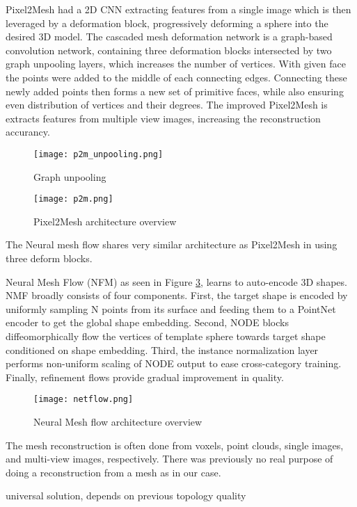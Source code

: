 Pixel2Mesh had a 2D CNN extracting features from a single image which is then leveraged by a deformation block, progressively deforming a sphere into the desired 3D model. The cascaded mesh deformation network is a graph-based convolution network, containing three deformation blocks intersected by two graph unpooling layers, which increases the number of vertices. With given face the points were added to the middle of each connecting edges. Connecting these newly added points then forms a new set of primitive faces, while also ensuring even distribution of vertices and their degrees. The improved Pixel2Mesh is extracts features from multiple view images, increasing the reconstruction accurancy. 

\begin{figure}[h]
    \centering
    \texttt{[image: p2m\_unpooling.png]}
    \caption{Graph unpooling\cite{p2m}}
    \label{fig:p2munpooling}
\end{figure}

\begin{figure}[h]
    \centering
    \texttt{[image: p2m.png]}
    \caption{Pixel2Mesh architecture overview \cite{p2m}}
    \label{fig:p2m}
\end{figure}

The Neural mesh flow shares very similar architecture as Pixel2Mesh in using three deform blocks.

Neural Mesh Flow (NFM) as seen in Figure \ref{fig:netflow}, learns to auto-encode 3D shapes. NMF broadly consists of four components. First, the target shape is encoded by uniformly sampling N points from its surface and feeding them to a PointNet \cite{pointnet} encoder to get the global shape embedding. Second, NODE blocks diffeomorphically flow the vertices of template sphere towards target shape conditioned on shape embedding. Third, the instance normalization layer performs non-uniform scaling of NODE output to ease cross-category training. Finally, refinement flows provide gradual improvement in quality.

\begin{figure}[h]
    \centering
    \texttt{[image: netflow.png]}
    \caption{Neural Mesh flow architecture overview \cite{neuralFlow}}
    \label{fig:netflow}
\end{figure}




The mesh reconstruction is often done from voxels, point clouds, single images, and multi-view images, respectively. There was previously no real purpose of doing a reconstruction from a mesh as in our case.

universal solution, depends on previous topology quality